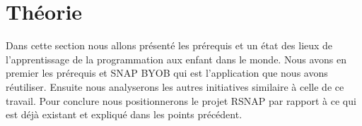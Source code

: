 \chapter{Théorie}
Dans cette section nous allons présenté les prérequis et un état des lieux de l'apprentissage de la programmation aux enfant dans le monde. Nous avons en premier les prérequis et SNAP BYOB qui est l'application que nous avons réutiliser. Ensuite nous analyserons les autres initiatives similaire à celle de ce travail. Pour conclure nous positionnerons le projet RSNAP par rapport à ce qui est déjà existant et expliqué dans les points précédent.




